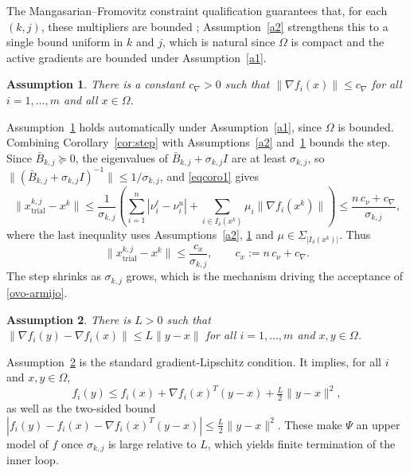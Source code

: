 \documentclass[11pt]{article}
\newcommand{\xkjtrial}{x^{k,j}_{\mathrm{trial}}}
\newtheorem{assumption}{Assumption}
\begin{document}
The Mangasarian--Fromovitz constraint qualification guarantees that, for each
$(k,j)$, these multipliers are bounded \cite{gauvin}; Assumption~\ref{a2}
strengthens this to a single bound uniform in $k$ and $j$, which is natural
since $\Omega$ is compact and the active gradients are bounded under
Assumption~\ref{a1}.

\begin{assumption} \label{a3}
There is a constant $c_\nabla > 0$ such that $\|\nabla f_i(x)\| \leq c_\nabla$
for all $i = 1, \ldots, m$ and all $x \in \Omega$.
\end{assumption}

Assumption~\ref{a3} holds automatically under Assumption~\ref{a1}, since
$\Omega$ is bounded. Combining Corollary~\ref{cor:step} with
Assumptions~\ref{a2} and~\ref{a3} bounds the step. Since
$\bar{B}_{k,j} \succeq 0$, the eigenvalues of
$\bar{B}_{k,j} + \sigma_{k,j} I$ are at least $\sigma_{k,j}$, so
$\|(\bar{B}_{k,j} + \sigma_{k,j} I)^{-1}\| \leq 1/\sigma_{k,j}$, and
\eqref{eqcoro1} gives
\[
\|\xkjtrial - x^k\| \leq \frac{1}{\sigma_{k,j}}
\left( \sum_{i=1}^n |\nu^\ell_i - \nu^u_i|
+ \sum_{i \in I_\delta(x^k)} \mu_i \|\nabla f_i(x^k)\| \right)
\leq \frac{n\,c_\nu + c_\nabla}{\sigma_{k,j}},
\]
where the last inequality uses Assumptions~\ref{a2}, \ref{a3} and
$\mu \in \Sigma_{|I_\delta(x^k)|}$. Thus
\begin{equation} \label{ccotasub}
\|\xkjtrial - x^k\| \leq \frac{c_x}{\sigma_{k,j}}, \qquad
c_x := n\,c_\nu + c_\nabla.
\end{equation}
The step shrinks as $\sigma_{k,j}$ grows, which is the mechanism driving the
acceptance of \eqref{ovo-armijo}.

\begin{assumption} \label{a4}
There is $L > 0$ such that $\|\nabla f_i(y) - \nabla f_i(x)\| \leq L \|y - x\|$
for all $i = 1, \ldots, m$ and $x, y \in \Omega$.
\end{assumption}

Assumption~\ref{a4} is the standard gradient-Lipschitz condition. It implies,
for all $i$ and $x, y \in \Omega$,
\begin{equation} \label{taylor}
f_i(y) \leq f_i(x) + \nabla f_i(x)^T(y - x) + \tfrac{L}{2}\|y - x\|^2,
\end{equation}
as well as the two-sided bound
$|f_i(y) - f_i(x) - \nabla f_i(x)^T(y - x)| \leq \tfrac{L}{2}\|y - x\|^2$. These
make $\Psi$ an upper model of $f$ once $\sigma_{k,j}$ is large relative to $L$,
which yields finite termination of the inner loop. 
\end{document}
